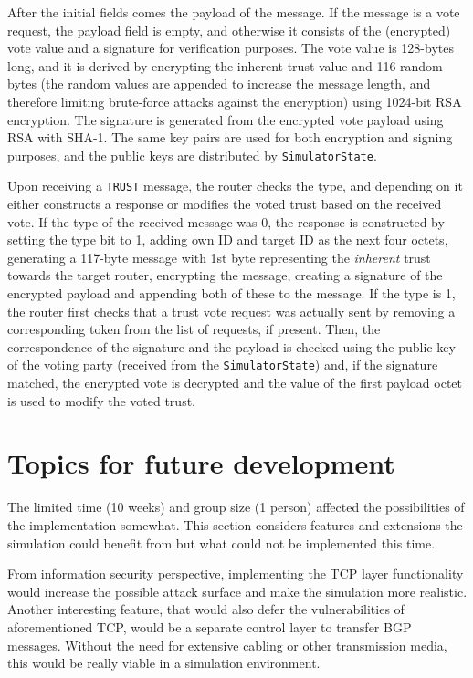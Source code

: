 \documentclass[11pt,a4paper,titlepage]{report}
\begin{document}
After the initial fields comes the payload of the message. If the message is a vote request, the payload field is empty, and otherwise it consists of the (encrypted) vote value and a signature for verification purposes. The vote value is 128-bytes long, and it is derived by encrypting the inherent trust value and 116 random bytes (the random values are appended to increase the message length, and therefore limiting brute-force attacks against the encryption) using 1024-bit RSA encryption. The signature is generated from the encrypted vote payload using RSA with SHA-1. The same key pairs are used for both encryption and signing purposes, and the public keys are distributed by \texttt{SimulatorState}.

Upon receiving a \texttt{TRUST} message, the router checks the type, and depending on it either constructs a response or modifies the voted trust based on the received vote. If the type of the received message was 0, the response is constructed by setting the type bit to 1, adding own ID and target ID as the next four octets, generating a 117-byte message with 1st byte representing the \emph{inherent} trust towards the target router, encrypting the message, creating a signature of the encrypted payload and appending both of these to the message. If the type is 1, the router first checks that a trust vote request was actually sent by removing a corresponding token from the list of requests, if present. Then, the correspondence of the signature and the payload is checked using the public key of the voting party (received from the \texttt{SimulatorState}) and, if the signature matched, the encrypted vote is decrypted and the value of the first payload octet is used to modify the voted trust.

\section{Topics for future development}\label{sec:future}
The limited time (10 weeks) and group size (1 person) affected the possibilities of the implementation somewhat. This section considers features and extensions the simulation could benefit from but what could not be implemented this time.

From information security perspective, implementing the TCP layer functionality would increase the possible attack surface and make the simulation more realistic. Another interesting feature, that would also defer the vulnerabilities of aforementioned TCP, would be a separate control layer to transfer BGP messages. Without the need for extensive cabling or other transmission media, this would be really viable in a simulation environment.
\end{document}
